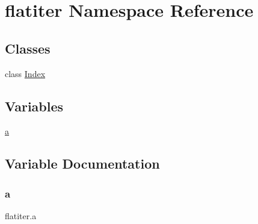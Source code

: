 \hypertarget{namespaceflatiter}{}\section{flatiter Namespace Reference}
\label{namespaceflatiter}
\subsection*{Classes}
\begin{DoxyCompactItemize}
\item 
class \hyperlink{classflatiter_1_1Index}{Index}
\end{DoxyCompactItemize}
\subsection*{Variables}
\begin{DoxyCompactItemize}
\item 
\hyperlink{namespaceflatiter_a7f4f96f456dd79b908d32c7b3904e869}{a}
\end{DoxyCompactItemize}


\subsection{Variable Documentation}
\mbox{\label{namespaceflatiter_a7f4f96f456dd79b908d32c7b3904e869}} 
\subsubsection{\texorpdfstring{a}{a}}
{\footnotesize\ttfamily flatiter.\+a}

